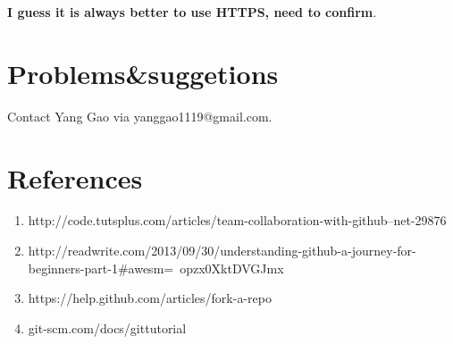\documentclass{article} %
\begin{document}
\textbf{I guess it is always better to use HTTPS, need to confirm}.

\section{Problems\&suggetions}
Contact Yang Gao via yanggao1119@gmail.com.

\section{References}

\begin{enumerate}
\item http://code.tutsplus.com/articles/team-collaboration-with-github--net-29876
\item http://readwrite.com/2013/09/30/understanding-github-a-journey-for-beginners-part-1\#awesm=~opzx0XktDVGJmx
\item https://help.github.com/articles/fork-a-repo
\item git-scm.com/docs/gittutorial
\end{enumerate}
\end{document}

